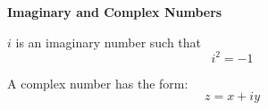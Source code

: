 \documentclass[10pt]{article}
\begin{document}
\begin{definition}

	\textbf{Imaginary and Complex Numbers} 

	$ i $ is an imaginary number such that
	\begin{equation}
		i^2 = -1
		\label{eq:389:i}
	\end{equation}

	A complex number has the form:
	\begin{equation}
		z = x + iy
		\label{eq:389:complex}
	\end{equation}
\end{definition}
\end{document}
